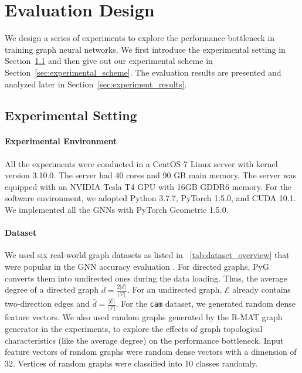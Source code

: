 \section{Evaluation Design}
\label{sec:experimental_design}

We design a series of experiments to explore the performance bottleneck in training graph neural networks.
We first introduce the experimental setting in Section~\ref{sec:experimental_env} and then give out our experimental scheme in Section~\ref{sec:experimental_scheme}.
The evaluation results are presented and analyzed later in Section~\ref{sec:experiment_results}.

\subsection{Experimental Setting}
\label{sec:experimental_env}

\paragraph{Experimental Environment}
All the experiments were conducted in a CentOS 7 Linux server with kernel version 3.10.0.
The server had 40 cores and 90 GB main memory.
The server was equipped with an NVIDIA Tesla T4 GPU with 16GB GDDR6 memory.
For the software environment, we adopted Python 3.7.7, PyTorch 1.5.0, and CUDA 10.1.
We implemented all the GNNs with PyTorch Geometric 1.5.0.

\paragraph{Dataset}
We used six real-world graph datasets as listed in \tablename~\ref{tab:dataset_overview} that were popular in the GNN accuracy evaluation \cite{yang2016_revisiting_semisupervised, zeng2020_graphsaint, shchur2018_pitfall_of_gnn}.
For directed graphs, PyG converts them into undirected ones during the data loading.
Thus, the average degree of a directed graph $\bar{d}=\frac{2|\mathcal{E}|}{|\mathcal{V}|}$.
For an undirected graph, $\mathcal{E}$ already contains two-direction edges and $\bar{d}=\frac{|\mathcal{E}|}{|\mathcal{V}|}$.
For the \texttt{cam} dataset, we generated random dense feature vectors.
We also used random graphs generated by the R-MAT graph generator \cite{rmat-generator} in the experiments, to explore the effects of graph topological characteristics (like the average degree) on the performance bottleneck.
Input feature vectors of random graphs were random dense vectors with a dimension of 32.
Vertices of random graphs were classified into 10 classes randomly.

